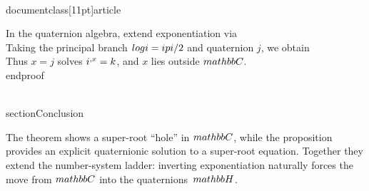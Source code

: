 \\documentclass[11pt]{article}
\begin{document}
In the quaternion algebra, extend exponentiation via
\\[
a^{\\,q} := \\exp\\!\\big((\\log a)\\,q\\big).
\\]
Taking the principal branch $\\log i = i\\pi/2$ and quaternion $j$, we obtain
\\[
i^{\\,j} = \\exp\\!\\left(\\left(\\frac{\\pi}{2} i\\right) j\\right)
       = \\exp\\!\\left(\\frac{\\pi}{2} (i j)\\right)
       = \\exp\\!\\left(\\frac{\\pi}{2} k\\right)
       = k.
\\]
Thus $x=j$ solves $i^{\\,x} = k$, and $x$ lies outside $\\mathbb{C}$.
\\end{proof}

\\section{Conclusion}

The theorem shows a super-root ``hole'' in $\\mathbb{C}$, while the proposition provides an explicit quaternionic solution to a super-root equation. Together they extend the number-system ladder: inverting exponentiation naturally forces the move from $\\mathbb{C}$ into the quaternions~$\\mathbb{H}$.
\
\end{document}
